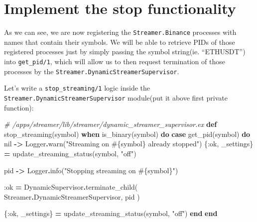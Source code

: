 \documentclass[
  oneside]{book}
\newenvironment{Shaded}{\begin{snugshade}}{\end{snugshade}}
\newcommand{\CommentTok}[1]{\textcolor[rgb]{0.56,0.35,0.01}{\textit{#1}}}
\newcommand{\ConstantTok}[1]{\textcolor[rgb]{0.00,0.00,0.00}{#1}}
\newcommand{\KeywordTok}[1]{\textcolor[rgb]{0.13,0.29,0.53}{\textbf{#1}}}
\newcommand{\NormalTok}[1]{#1}
\newcommand{\OperatorTok}[1]{\textcolor[rgb]{0.81,0.36,0.00}{\textbf{#1}}}
\newcommand{\OtherTok}[1]{\textcolor[rgb]{0.56,0.35,0.01}{#1}}
\newcommand{\StringTok}[1]{\textcolor[rgb]{0.31,0.60,0.02}{#1}}
\newcommand{\VariableTok}[1]{\textcolor[rgb]{0.00,0.00,0.00}{#1}}
\begin{document}
\hypertarget{implement-the-stop-functionality}{%
\section{Implement the stop functionality}\label{implement-the-stop-functionality}}

As we can see, we are now registering the \texttt{Streamer.Binance} processes with names that contain their symbols. We will be able to retrieve PIDs of those registered processes just by simply passing the symbol string(ie. ``ETHUSDT'') into \texttt{get\_pid/1}, which will allow us to then request termination of those processes by the \texttt{Streamer.DynamicStreamerSupervisor}.

Let's write a \texttt{stop\_streaming/1} logic inside the \texttt{Streamer.DynamicStreamerSupervisor} module(put it above first private function):

\begin{Shaded}
\begin{Highlighting}[]
  \CommentTok{\# /apps/streamer/lib/streamer/dynamic\_streamer\_supervisor.ex}
  \KeywordTok{def}\NormalTok{ stop\_streaming(symbol) }\KeywordTok{when}\NormalTok{ is\_binary(symbol) }\KeywordTok{do}
    \KeywordTok{case}\NormalTok{ get\_pid(symbol) }\KeywordTok{do}
      \ConstantTok{nil} \OperatorTok{{-}\textgreater{}}
        \ConstantTok{Logger}\OperatorTok{.}\NormalTok{warn(}\StringTok{"Streaming on }\OtherTok{\#\{}\NormalTok{symbol}\OtherTok{\}}\StringTok{ already stopped"}\NormalTok{)}
\NormalTok{        \{}\VariableTok{:ok}\NormalTok{, \_settings\} }\OperatorTok{=}\NormalTok{ update\_streaming\_status(symbol, }\StringTok{"off"}\NormalTok{)}

\NormalTok{      pid }\OperatorTok{{-}\textgreater{}}
        \ConstantTok{Logger}\OperatorTok{.}\NormalTok{info(}\StringTok{"Stopping streaming on }\OtherTok{\#\{}\NormalTok{symbol}\OtherTok{\}}\StringTok{"}\NormalTok{)}

        \VariableTok{:ok} \OperatorTok{=}
          \ConstantTok{DynamicSupervisor}\OperatorTok{.}\NormalTok{terminate\_child(}
            \ConstantTok{Streamer}\OperatorTok{.}\ConstantTok{DynamicStreamerSupervisor}\NormalTok{,}
\NormalTok{            pid}
\NormalTok{          )}

\NormalTok{        \{}\VariableTok{:ok}\NormalTok{, \_settings\} }\OperatorTok{=}\NormalTok{ update\_streaming\_status(symbol, }\StringTok{"off"}\NormalTok{)}
    \KeywordTok{end}
  \KeywordTok{end}
\end{Highlighting}
\end{Shaded}
\end{document}

